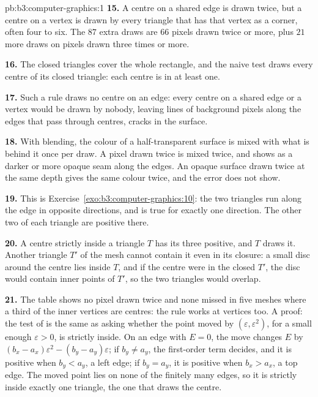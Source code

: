 \begin{solution}{pb:b3:computer-graphics:1}
\textbf{15.} A centre on a shared edge is drawn twice, but a centre on a vertex is drawn by every triangle that has that vertex as a corner, often four to six. The $87$ extra draws are $66$ pixels drawn twice or more, plus $21$ more draws on pixels drawn three times or more.

\textbf{16.} The closed triangles cover the whole rectangle, and the naive test draws every centre of its closed triangle: each centre is in at least one.

\textbf{17.} Such a rule draws no centre on an edge: every centre on a shared edge or a vertex would be drawn by nobody, leaving lines of background pixels along the edges that pass through centres, cracks in the surface.

\textbf{18.} With blending, the colour of a half-transparent surface is mixed with what is behind it once per draw. A pixel drawn twice is mixed twice, and shows as a darker or more opaque seam along the edges. An opaque surface drawn twice at the same depth gives the same colour twice, and the error does not show.

\textbf{19.} This is Exercise~\ref{exo:b3:computer-graphics:10}: the two triangles run along the edge in opposite directions, and  is true for exactly one direction. The other two  of each triangle are positive there.

\textbf{20.} A centre strictly inside a triangle $T$ has its three  positive, and $T$ draws it. Another triangle $T'$ of the mesh cannot contain it even in its closure: a small disc around the centre lies inside $T$, and if the centre were in the closed $T'$, the disc would contain inner points of $T'$, so the two triangles would overlap.

\textbf{21.} The table shows no pixel drawn twice and none missed in five meshes where a third of the inner vertices are centres: the rule works at vertices too. A proof: the test of  is the same as asking whether the point moved by $(\varepsilon, \varepsilon^2)$, for a small enough $\varepsilon > 0$, is strictly inside. On an edge with $E = 0$, the move changes $E$ by $(b_x - a_x)\varepsilon^2 - (b_y - a_y)\varepsilon$; if $b_y \neq a_y$, the first-order term decides, and it is positive when $b_y < a_y$, a left edge; if $b_y = a_y$, it is positive when $b_x > a_x$, a top edge. The moved point lies on none of the finitely many edges, so it is strictly inside exactly one triangle, the one that draws the centre.


\end{solution}

